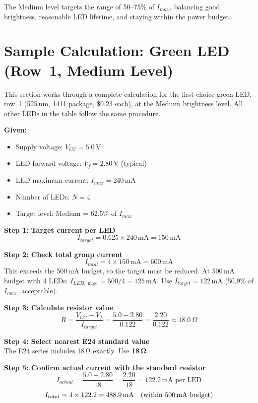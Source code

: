 \documentclass[12pt,letterpaper]{article}
\begin{document}
The Medium level targets the range of 50--75\% of $I_{max}$, balancing good brightness,
reasonable LED lifetime, and staying within the power budget.

\section{Sample Calculation: Green LED (Row~1, Medium Level)}

This section works through a complete calculation for the first-choice green LED,
row~1 (525\,nm, 1411 package, \$0.23 each), at the Medium brightness level.
All other LEDs in the table follow the same procedure.

\textbf{Given:}
\begin{itemize}[leftmargin=2em]
  \item Supply voltage: $V_{CC} = 5.0$\,V
  \item LED forward voltage: $V_f = 2.80$\,V (typical)
  \item LED maximum current: $I_{max} = 240$\,mA
  \item Number of LEDs: $N = 4$
  \item Target level: Medium = 62.5\% of $I_{max}$
\end{itemize}

\textbf{Step 1: Target current per LED}
\[
  I_{target} = 0.625 \times 240\,\text{mA} = 150\,\text{mA}
\]

\textbf{Step 2: Check total group current}
\[
  I_{total} = 4 \times 150\,\text{mA} = 600\,\text{mA}
\]
This exceeds the 500\,mA budget, so the target must be reduced.
At 500\,mA budget with 4 LEDs: $I_{LED,\max} = 500/4 = 125$\,mA.
Use $I_{target} = 122$\,mA (50.9\% of $I_{max}$, acceptable).

\textbf{Step 3: Calculate resistor value}
\[
  R = \frac{V_{CC} - V_f}{I_{target}} = \frac{5.0 - 2.80}{0.122} = \frac{2.20}{0.122} \approx 18.0\,\Omega
\]

\textbf{Step 4: Select nearest E24 standard value}\\
The E24 series includes 18\,\si{\ohm} exactly. Use \textbf{18\,\si{\ohm}}.

\textbf{Step 5: Confirm actual current with the standard resistor}
\[
  I_{actual} = \frac{5.0 - 2.80}{18} = \frac{2.20}{18} = 122.2\,\text{mA per LED}
\]
\[
  I_{total} = 4 \times 122.2 = 488.9\,\text{mA} \quad \text{(within 500\,mA budget)}
\]
\end{document}
